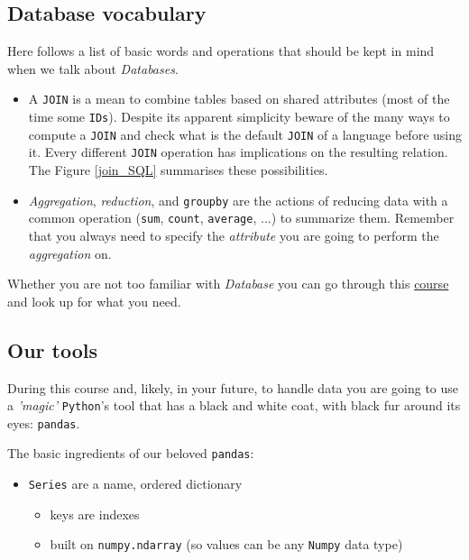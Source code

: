 \subsection*{Database vocabulary}

Here follows a list of basic words and operations that should be kept in mind when we talk about \emph{Databases}.

 \begin{itemize}
  \item A \texttt{JOIN} is a mean to combine tables based on shared attributes (most of the time some \texttt{IDs}). Despite its apparent simplicity beware of the many ways to compute a \texttt{JOIN} and check what is the default \texttt{JOIN} of a language before using it. Every different \texttt{JOIN} operation has implications on the resulting relation. The Figure \ref{join_SQL} summarises these possibilities.
  \item \emph{Aggregation}, \emph{reduction}, and \texttt{groupby} are the actions of reducing data with a common operation (\texttt{sum}, \texttt{count}, \texttt{average}, ...) to summarize them. Remember that you always need to specify the \emph{attribute} you are going to perform the \emph{aggregation} on.
 \end{itemize}
 
 Whether you are not too familiar with \emph{Database} you can go through this \href{https://lagunita.stanford.edu/courses/DB/2014/SelfPaced/about}{course} and look up for what you need.

  
\subsection{Our tools}

During this course and, likely, in your future, to handle data you are going to use a \emph{'magic'} \texttt{Python}'s tool that has a black and white coat, with black fur around its eyes: \texttt{pandas}. 

The basic ingredients of our beloved \texttt{pandas}:

\begin{itemize}
 \item \texttt{Series} are a name, ordered dictionary
\begin{itemize}
 \item keys are indexes
 \item built on \texttt{numpy.ndarray} (so values can be any \texttt{Numpy} data type)
\end{itemize} 
\end{itemize}


